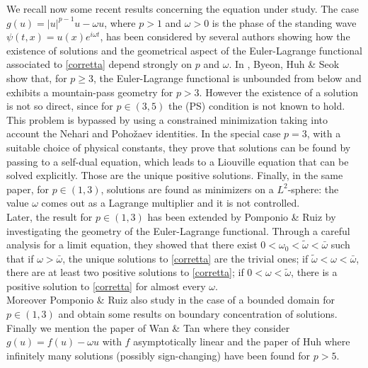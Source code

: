 \documentclass[11pt,leqno,twoside,reqno]{amsart}
\numberwithin{equation}{section}
\begin{document}
We recall now some recent results concerning the equation under study.
The case  $g(u)=|u|^{p-1}u-{\omega} u$, where $p>1$ and ${\omega}>0$ is the phase of the standing wave $\psi(t,x)=u(x)e^{i\omega t}$,
has been considered by several authors showing how the existence of solutions and the geometrical aspect of the Euler-Lagrange 
functional associated to \eqref{corretta} depend strongly on $p$ and  ${\omega}$.
In \cite{BHS}, Byeon, Huh \& Seok  show that, for $p\geq3$,  the Euler-Lagrange functional  is unbounded from below and exhibits a mountain-pass geometry for $p>3$.  However the existence of a  solution is not so direct, since for $p \in (3,5)$ the (PS) condition is not known to hold. This problem is bypassed  by using a constrained minimization taking into account the Nehari and Poho\v{z}aev identities. In the special case $p=3$, with a suitable choice of physical constants, they prove that solutions can be found by passing to a self-dual equation, which leads to a Liouville equation that can be solved explicitly. Those are the unique positive solutions. Finally, in the same paper, for $p\in(1,3)$, solutions are found as minimizers on a $L^2$-sphere: the value ${\omega}$ comes out as a Lagrange multiplier and it is not controlled. \\
Later, the result for $p \in  (1,3)$ has been extended by Pomponio \& Ruiz \cite{PR1} 
by investigating the geometry of the Euler-Lagrange  functional. 
Through a careful analysis for a limit equation, they showed that there exist $0 < {\omega}_0 < \tilde {\omega} < \bar {\omega}$ such that if ${\omega}> \bar {\omega}$, 
the unique solutions to \eqref{corretta} are the trivial ones; if $\tilde {\omega} < {\omega} < \bar {\omega}$, there are at least two positive solutions to 
\eqref{corretta}; if $0 < {\omega} < \tilde {\omega}$, there is a positive solution to \eqref{corretta} for almost every ${\omega}$. \\
Moreover Pomponio \& Ruiz also study in \cite{PR2} the case of a bounded domain for $p \in  (1, 3)$ and obtain some results on boundary 
concentration of solutions.
\\
Finally we mention the paper of Wan \& Tan \cite{WT} where they consider $g(u)=f(u)-{\omega} u$ with $f$ asymptotically linear
and the paper of  Huh \cite{huh2} where
infinitely many solutions (possibly sign-changing) have been found  for $p>5$.
\end{document}
